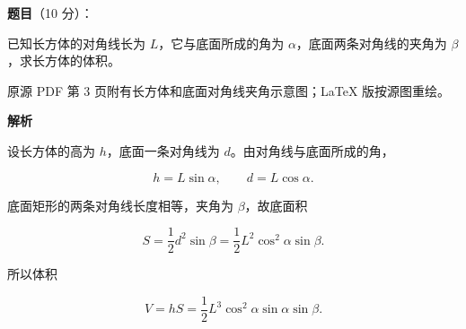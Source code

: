 \begin{answer}

\textbf{题目}（10 分）：

已知长方体的对角线长为 $L$，它与底面所成的角为 $\alpha$，底面两条对角线的夹角为 $\beta$，求长方体的体积。

\begin{gktip}
原源 PDF 第 3 页附有长方体和底面对角线夹角示意图；LaTeX 版按源图重绘。
\end{gktip}
\nopagebreak[4]
\begin{center}\end{center}
\nopagebreak[4]
\textbf{解析}

设长方体的高为 $h$，底面一条对角线为 $d$。由对角线与底面所成的角，

\nopagebreak[4]
\[
h=L\sin\alpha,\qquad d=L\cos\alpha.
\]

底面矩形的两条对角线长度相等，夹角为 $\beta$，故底面积

\nopagebreak[4]
\[
S=\frac12d^2\sin\beta
=\frac12L^2\cos^2\alpha\sin\beta.
\]

所以体积

\nopagebreak[4]
\[
V=hS
=\frac12L^3\cos^2\alpha\sin\alpha\sin\beta.
\]


\end{answer}
